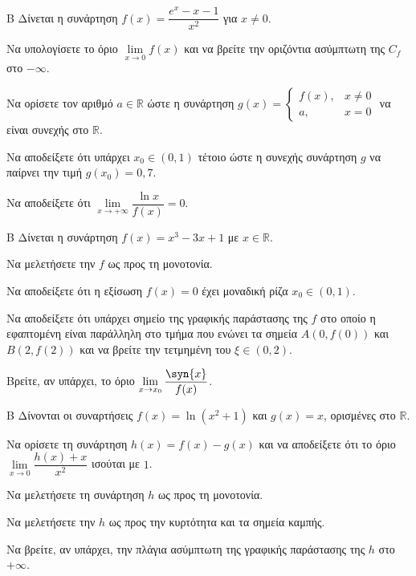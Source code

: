 \begin{thema}{Β}
Δίνεται η συνάρτηση $f(x) = \dfrac{e^x - x - 1}{x^2}$ για $x \ne 0$.
\begin{erwthma}
\item Να υπολογίσετε το όριο $\lim\limits_{x \to 0} f(x)$ και να βρείτε την οριζόντια ασύμπτωτη της $C_f$ στο $-\infty$.
\item Να ορίσετε τον αριθμό $a \in \mathbb{R}$ ώστε η συνάρτηση $g(x) = \begin{cases} f(x), & x \ne 0 \\ a, & x = 0 \end{cases}$ να είναι συνεχής στο $\mathbb{R}$.
\item Να αποδείξετε ότι υπάρχει $x_0 \in (0, 1)$ τέτοιο ώστε η συνεχής συνάρτηση $g$ να παίρνει την τιμή $g(x_0) = 0,7$.
\item Να αποδείξετε ότι $\lim\limits_{x \to +\infty} \dfrac{\ln x}{f(x)} = 0$.
\end{erwthma}
\end{thema}

\begin{thema}{Β}
Δίνεται η συνάρτηση $f(x) = x^3 - 3x + 1$ με $x \in \mathbb{R}$.
\begin{erwthma}
\item Να μελετήσετε την $f$ ως προς τη μονοτονία.
\item Να αποδείξετε ότι η εξίσωση $f(x)=0$ έχει μοναδική ρίζα $x_0 \in (0, 1)$.
\item Να αποδείξετε ότι υπάρχει σημείο της γραφικής παράστασης της $f$ στο οποίο η εφαπτομένη είναι παράλληλη στο τμήμα που ενώνει τα σημεία $A(0, f(0))$ και $B(2, f(2))$ και να βρείτε την τετμημένη του $\xi \in (0, 2)$.
\item Βρείτε, αν υπάρχει, το όριο $\lim\limits_{x\to x_0}{\dfrac{\syn{x}}{f(x)}}$.
\end{erwthma}
\end{thema}

\begin{thema}{Β}
Δίνονται οι συναρτήσεις $f(x) = \ln(x^2+1)$ και $g(x) = x$, ορισμένες στο $\mathbb{R}$.
\begin{erwthma}
\item Να ορίσετε τη συνάρτηση $h(x) = f(x) - g(x)$ και να αποδείξετε ότι το όριο $\lim\limits_{x \to 0} \dfrac{h(x)+x}{x^2}$ ισούται με $1$.
\item Να μελετήσετε τη συνάρτηση $h$ ως προς τη μονοτονία.
\item Να μελετήσετε την $h$ ως προς την κυρτότητα και τα σημεία καμπής.
\item Να βρείτε, αν υπάρχει, την πλάγια ασύμπτωτη της γραφικής παράστασης της $h$ στο $+\infty$.
\end{erwthma}
\end{thema}

